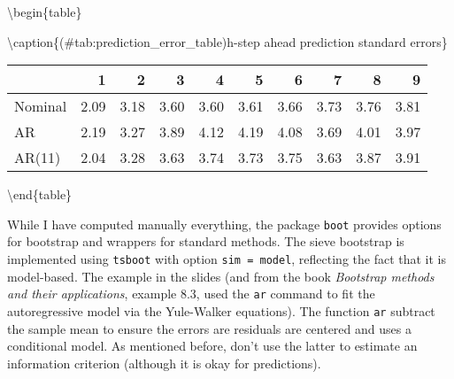 \documentclass[]{book}
\newenvironment{Shaded}{\begin{snugshade}}{\end{snugshade}}
\newcommand{\DataTypeTok}[1]{\textcolor[rgb]{0.13,0.29,0.53}{#1}}
\newcommand{\DecValTok}[1]{\textcolor[rgb]{0.00,0.00,0.81}{#1}}
\newcommand{\KeywordTok}[1]{\textcolor[rgb]{0.13,0.29,0.53}{\textbf{#1}}}
\newcommand{\NormalTok}[1]{#1}
\newcommand{\OperatorTok}[1]{\textcolor[rgb]{0.81,0.36,0.00}{\textbf{#1}}}
\newcommand{\StringTok}[1]{\textcolor[rgb]{0.31,0.60,0.02}{#1}}
\begin{document}
\begin{Shaded}
\end{Shaded}

\textbackslash{}begin\{table\}

\textbackslash{}caption\{(\#tab:prediction\_error\_table)h-step ahead
prediction standard errors\} \centering

\begin{tabular}[t]{l|r|r|r|r|r|r|r|r|r}
\hline
  & 1 & 2 & 3 & 4 & 5 & 6 & 7 & 8 & 9\\
\hline
Nominal & 2.09 & 3.18 & 3.60 & 3.60 & 3.61 & 3.66 & 3.73 & 3.76 & 3.81\\
\hline
AR & 2.19 & 3.27 & 3.89 & 4.12 & 4.19 & 4.08 & 3.69 & 4.01 & 3.97\\
\hline
AR(11) & 2.04 & 3.28 & 3.63 & 3.74 & 3.73 & 3.75 & 3.63 & 3.87 & 3.91\\
\hline
\end{tabular}

\textbackslash{}end\{table\}

While I have computed manually everything, the package \texttt{boot}
provides options for bootstrap and wrappers for standard methods. The
sieve bootstrap is implemented using \texttt{tsboot} with option
\texttt{sim\ =\ model}, reflecting the fact that it is model-based. The
example in the slides (and from the book \emph{Bootstrap methods and
their applications}, example 8.3, used the \texttt{ar} command to fit
the autoregressive model via the Yule-Walker equations). The function
\texttt{ar} subtract the sample mean to ensure the errors are residuals
are centered and uses a conditional model. As mentioned before, don't
use the latter to estimate an information criterion (although it is okay
for predictions).
\end{document}
